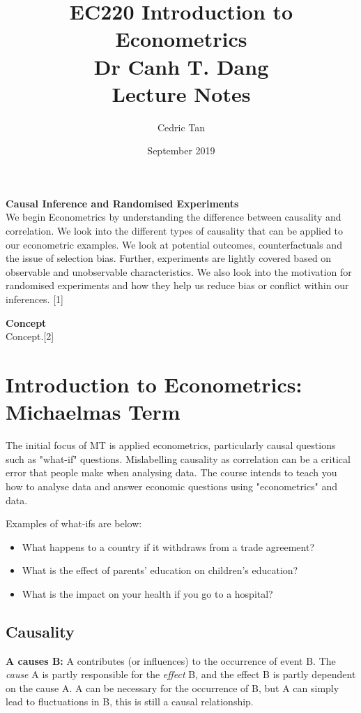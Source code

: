 \documentclass[12pt, letterpaper]{article}
\title{
	{EC220 Introduction to Econometrics}\\
	{\large{Dr Canh T. Dang}}\\
	{\large{Lecture Notes}}
}
\author{Cedric Tan}
\date{September 2019}
\begin{document}
\maketitle
{\small
  \noindent\textbf{Causal Inference and Randomised Experiments}\\
  We begin Econometrics by understanding the difference between causality and correlation. We look into the different types of causality that can be applied to our econometric examples. We look at potential outcomes, counterfactuals and the issue of selection bias. Further, experiments are lightly covered based on observable and unobservable characteristics. We also look into the motivation for randomised experiments and how they help us reduce bias or conflict within our inferences. \hspace*{\fill}[1]

  \vspace{10pt}
  \noindent\textbf{Concept}\\
  Concept.\hspace*{\fill}[2]

\newpage
\tableofcontents
\newpage
\section{Introduction to Econometrics: Michaelmas Term}
The initial focus of MT is applied econometrics, particularly causal questions such as "what-if" questions. Mislabelling causality as correlation can be a critical error that people make when analysing data. The course intends to teach you how to analyse data and answer economic questions using "econometrics" and data.

\vspace{10pt}
\noindent Examples of what-ifs are below:
\begin{itemize}
	\item What happens to a country if it withdraws from a trade agreement?
	\item What is the effect of parents' education on children's education?
	\item What is the impact on your health if you go to a hospital?
\end{itemize}

\subsection{Causality}
\textbf{A causes B:} A contributes (or influences) to the occurrence of event B. The \textit{cause} A is partly responsible for the \textit{effect}
 B, and the effect B is partly dependent on the cause A. A can be necessary for the occurrence of B, but A can simply lead to fluctuations in B, this is still a causal relationship.
 
}
\end{document}
